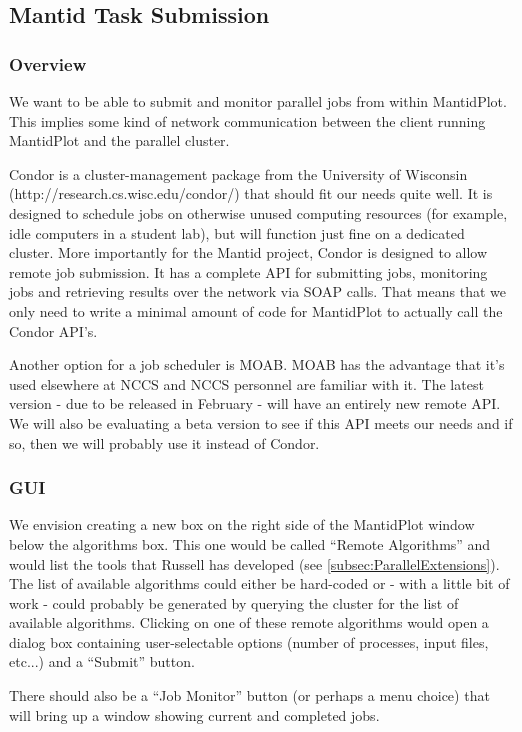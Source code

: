 \subsection{Mantid Task Submission}
\subsubsection{Overview}
We want to be able to submit and monitor parallel jobs from within MantidPlot.  This implies some kind of network communication between the client running MantidPlot and the parallel cluster.

Condor is a cluster-management package from the University of Wisconsin (http://research.cs.wisc.edu/condor/) that should fit our needs quite well.  It is designed to schedule jobs on otherwise unused computing resources (for example, idle computers in a student lab), but will function just fine on a dedicated cluster.  More importantly for the Mantid project, Condor is designed to allow remote job submission.  It has a complete API for submitting jobs, monitoring jobs and retrieving results over the network via SOAP calls.  That means that we only need to write a minimal amount of code for MantidPlot to actually call the Condor API's.

Another option for a job scheduler is MOAB.  MOAB has the advantage that it's used elsewhere at NCCS and NCCS personnel are familiar with it.  The latest version - due to be released in February - will have an entirely new remote API.  We will also be evaluating a beta version to see if this API meets our needs and if so, then we will probably use it instead of Condor.  

\subsubsection{GUI}
We envision creating a new box on the right side of the MantidPlot window below the algorithms box.  This one would be called ``Remote Algorithms'' and would list the tools that Russell has developed (see \ref{subsec:ParallelExtensions}).  The list of available algorithms could either be hard-coded or - with a little bit of work - could probably be generated by querying the cluster for the list of available algorithms.  Clicking on one of these remote algorithms would open a dialog box containing user-selectable options (number of processes, input files, etc...) and a ``Submit'' button.

There should also be a ``Job Monitor'' button (or perhaps a menu choice) that will bring up a window showing current and completed jobs.

